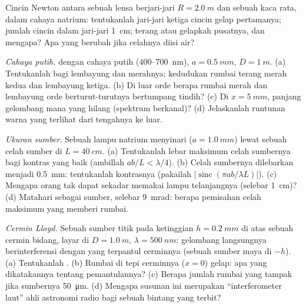 \begin{exercise}[$\star$]\label{exo:b2:two-wave-interference:4}
Cincin Newton antara sebuah lensa berjari-jari $R = \qty{2.0}{m}$ dan sebuah kaca rata, dalam
cahaya natrium: tentukanlah jari-jari ketiga cincin gelap pertamanya; jumlah cincin
dalam jari-jari \qty{1}{cm}; terang atau gelapkah pusatnya, dan mengapa?
Apa yang berubah jika celahnya diisi air?
\end{exercise}

\begin{exercise}[$\star\star$]\label{exo:b2:two-wave-interference:5}
\emph{Cahaya putih.}  dengan cahaya putih ($400$--\qty{700}{nm}),
$a = \qty{0.5}{mm}$, $D = \qty{1}{m}$. (a) Tentukanlah  bagi lembayung dan merahnya;
kedudukan rumbai terang merah kedua dan lembayung ketiga. (b)
Di luar orde berapa rumbai merah dan lembayung orde berturut-turutnya
bertumpang tindih? (c) Di $x = \qty{5}{mm}$, panjang gelombang mana yang hilang
(spektrum berkanal)? (d) Jelaskanlah runtunan warna yang terlihat dari
tengahnya ke luar.
\end{exercise}

\begin{exercise}[$\star\star$]\label{exo:b2:two-wave-interference:6}
\emph{Ukuran sumber.} Sebuah lampu natrium menyinari  ($a = \qty{1.0}{mm}$)
lewat sebuah celah sumber di $L = \qty{40}{cm}$. (a) Tentukanlah lebar maksimum
celah sumbernya bagi kontras yang baik (ambillah $ab/L < \lambda/4$). (b) Celah sumbernya
dilebarkan menjadi \qty{0.5}{mm}: tentukanlah kontrasnya (pakailah $|\operatorname{sinc}(\pi ab/\lambda L)|$).
(c) Mengapa orang tak dapat sekadar memakai lampu telanjangnya (selebar \qty{1}{cm})? (d)
Matahari sebagai sumber, selebar \qty{9}{mrad}: berapa pemisahan celah maksimum yang
memberi rumbai.
\end{exercise}

\begin{exercise}[$\star\star$]\label{exo:b2:two-wave-interference:7}
\emph{Cermin Lloyd.} Sebuah sumber titik pada ketinggian $h = \qty{0.2}{mm}$ di atas sebuah
cermin bidang, layar di $D = \qty{1.0}{m}$, $\lambda = \qty{500}{nm}$: gelombang langsungnya
berinterferensi dengan yang terpantul cerminnya (sebuah sumber maya di
$-h$). (a) Tentukanlah . (b) Rumbai di tepi cerminnya ($x = 0$)
gelap: apa yang dikatakannya tentang pemantulannya? (c) Berapa jumlah rumbai
yang tampak jika  sumbernya \qty{50}{\micro m}. (d) Mengapa
susunan ini merupakan ``interferometer laut'' ahli astronomi radio bagi
sebuah bintang yang terbit?
\end{exercise}


